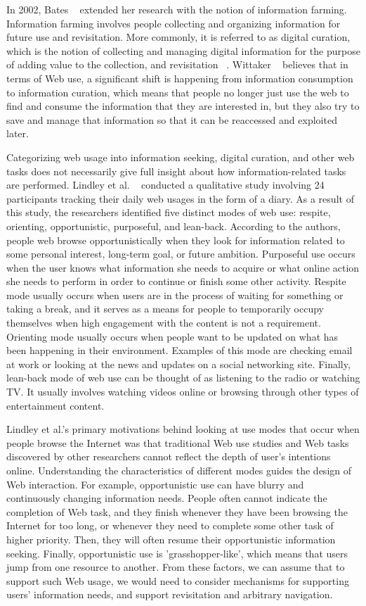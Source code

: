 \documentclass{casconpaper}
\begin{document}
{In 2002, Bates ~\cite{bates2002} extended her research with the notion of information farming. Information farming involves people collecting and organizing information for future use and revisitation. More commonly, it is referred to as digital curation, which is the notion of collecting and managing digital information for the purpose of adding value to the collection, and revisitation ~\cite{beagrie}. Wittaker ~\cite{wittaker} believes that in terms of Web use, a significant shift is happening from information consumption to information curation, which means that people no longer just use the web to find and consume the information that they are interested in, but they also try to save and manage that information so that  it can be reaccessed and exploited later. 

Categorizing web usage into information seeking,  digital curation, and other web tasks does not necessarily give full insight about how information-related tasks are performed. Lindley et al. ~\cite{lindley} conducted a qualitative study involving 24 participants tracking their daily web usages in the form of a diary. As a result of this study, the researchers identified five distinct modes of web use: respite, orienting, opportunistic, purposeful, and lean-back. According to the authors, people web browse opportunistically when they look for information related to some personal interest, long-term goal, or future ambition. Purposeful use occurs when the user knows what information she needs to acquire or what online action she needs to perform in order to continue or finish some other activity. Respite mode usually occurs when users are in the process of waiting for something or taking a break, and it serves as a means for people to temporarily occupy themselves when high engagement with the content is not a requirement. Orienting mode usually occurs when people want to be updated on what has been happening in their environment. Examples of this mode are checking email at work or looking at the news and updates on a social networking site. Finally, lean-back mode of web use can be thought of as listening to the radio or watching TV. It usually involves watching videos online or browsing through other types of entertainment content. 

Lindley et al.'s primary motivations behind looking at use modes that occur when people browse the Internet was that traditional Web use studies and Web tasks discovered by other researchers cannot reflect the depth of user's intentions online. Understanding the characteristics of different modes guides the design of Web interaction. For example, opportunistic use can have blurry and continuously changing information needs. People often cannot indicate the completion of Web task, and they finish whenever they have been browsing the Internet for too long, or whenever they need to complete some other task of higher priority. Then, they will often resume their opportunistic information seeking. Finally, opportunistic use is 'grasshopper-like', which means that users jump from one resource to another. From these factors, we can assume that to support such Web usage, we would need to consider mechanisms for supporting users' information needs, and support revisitation and arbitrary navigation.

}
\end{document}
